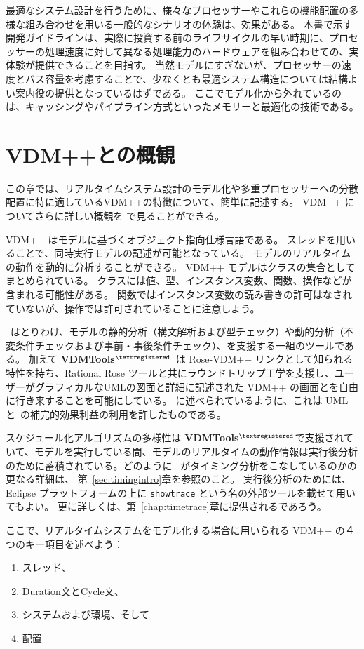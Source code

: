 \documentclass[\pformat,12pt]{jreport}
\newcommand{\vdmtools}{\textbf{VDMTools}$^{\mathbf{{\textregistered}}}$}
\begin{document}
最適なシステム設計を行うために、様々なプロセッサーやこれらの機能配置の多様な組み合わせを用いる一般的なシナリオの体験は、効果がある。
本書で示す開発ガイドラインは、実際に投資する前のライフサイクルの早い時期に、プロセッサーの処理速度に対して異なる処理能力のハードウェアを組み合わせての、実体験が提供できることを目指す。
当然モデルにすぎないが、プロセッサーの速度とバス容量を考慮することで、少なくとも最適システム構造については結構よい案内役の提供となっているはずである。
ここでモデル化から外れているのは、キャッシングやパイプライン方式といったメモリーと最適化の技術である。

\section{VDM++と\VDMTools の概観}

この章では、リアルタイムシステム設計のモデル化や多重プロセッサーへの分散配置に特に適しているVDM++の特徴について、簡単に記述する。
VDM++ についてさらに詳しい概観を \cite{LangManPP,UserManPP}で見ることができる。


VDM++ はモデルに基づくオブジェクト指向仕様言語である。
スレッドを用いることで、同時実行モデルの記述が可能となっている。
モデルのリアルタイムの動作を動的に分析することができる。
VDM++ モデルはクラスの集合としてまとめられている。
クラスには値、型、インスタンス変数、関数、操作などが含まれる可能性がある。
関数ではインスタンス変数の読み書きの許可はなされていないが、操作では許可されていることに注意しよう。

\VDMTools\ はとりわけ、モデルの静的分析（構文解析および型チェック）や動的分析（不変条件チェックおよび事前・事後条件チェック）、を支援する一組のツールである。
加えて \vdmtools\ は Rose-VDM++ リンクとして知られる特性を持ち、Rational Rose
\cite{Rose&00} ツールと共にラウンドトリップ工学を支援し、ユーザーがグラフィカルなUMLの図面と詳細に記述された VDM++ の画面とを自由に行き来することを可能にしている。
\cite{Guidelines}に述べられているように、これは UML と\VDMTools\ の補完的効果利益の利用を許したものである。

スケジュール化アルゴリズムの多様性は \vdmtools で支援されていて、モデルを実行している間、モデルのリアルタイムの動作情報は実行後分析のために蓄積されている。どのように \VDMTools\ がタイミング分析をこなしているのかの更なる詳細は、
第~\ref{sec:timingintro}章を参照のこと。
実行後分析のためには、 Eclipse プラットフォームの上に \texttt{showtrace} という名の外部ツールを載せて用いてもよい。
更に詳しくは、第~\ref{chap:timetrace}章に提供されるであろう。

ここで、リアルタイムシステムをモデル化する場合に用いられる VDM++ の４つのキー項目を述べよう：
\begin{enumerate}
\item スレッド、
\item Duration文とCycle文、
\item システムおよび環境、そして
\item 配置
\end{enumerate}
\end{document}
